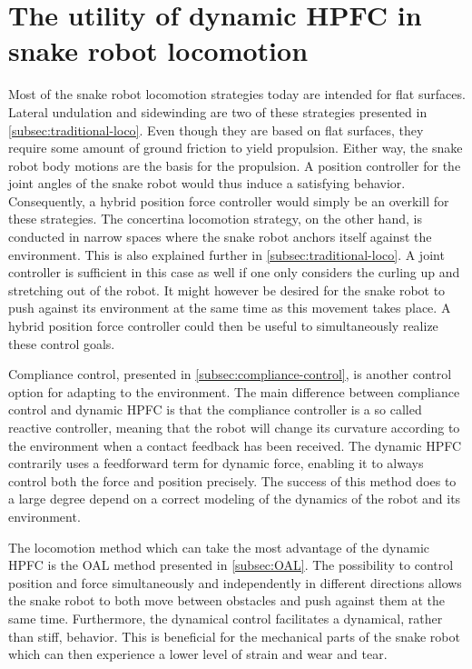 \section{The utility of dynamic HPFC in snake robot locomotion}

Most of the snake robot locomotion strategies today are intended for flat surfaces. Lateral undulation and sidewinding are two of these strategies presented in \ref{subsec:traditional-loco}. Even though they are based on flat surfaces, they require some amount of ground friction to yield propulsion. Either way, the snake robot body motions are the basis for the propulsion. A position controller for the joint angles of the snake robot would thus induce a satisfying behavior. Consequently, a hybrid position force controller would simply be an overkill for these strategies. The concertina locomotion strategy, on the other hand, is conducted in narrow spaces where the snake robot anchors itself against the environment. This is also explained further in \ref{subsec:traditional-loco}. A joint controller is sufficient in this case as well if one only considers the curling up and stretching out of the robot. It might however be desired for the snake robot to push against its environment at the same time as this movement takes place. A hybrid position force controller could then be useful to simultaneously realize these control goals.

Compliance control, presented in \ref{subsec:compliance-control}, is another control option for adapting to the environment. The main difference between compliance control and dynamic HPFC is that the compliance controller is a so called reactive controller, meaning that the robot will change its curvature according to the environment when a contact feedback has been received. The dynamic HPFC contrarily uses a feedforward term for dynamic force, enabling it to always control both the force and position precisely. The success of this method does to a large degree depend on a correct modeling of the dynamics of the robot and its environment.

The locomotion method which can take the most advantage of the dynamic HPFC is the OAL method presented in \ref{subsec:OAL}. The possibility to control position and force simultaneously and independently in different directions allows the snake robot to both move between obstacles and push against them at the same time. Furthermore, the dynamical control facilitates a dynamical, rather than stiff, behavior. This is beneficial for the mechanical parts of the snake robot which can then experience a lower level of strain and wear and tear. 


